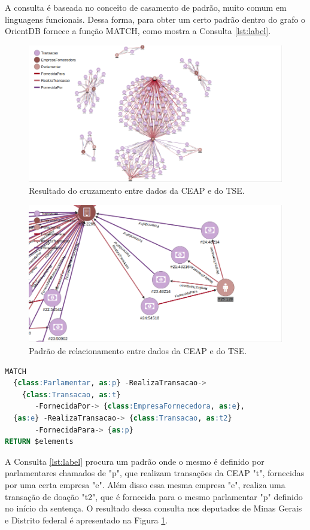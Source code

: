 \documentclass[12pt]{article}
\begin{document}
	A consulta é baseada no conceito de casamento de padrão, muito comum em linguagens funcionais. Dessa forma, para obter um certo padrão dentro do grafo o OrientDB fornece a função MATCH, como mostra a Consulta \ref{lst:label}.
	
\begin{figure}[ht]
\centering
\includegraphics[width=.85\textwidth]{orient.png}
\caption{Resultado do cruzamento entre dados da CEAP e do TSE.}
\label{fig:orient}
\end{figure}

\begin{figure}[ht]
\centering
\includegraphics[width=.85\textwidth]{padrao.png}
\caption{Padrão de relacionamento entre dados da CEAP e do TSE.}
\label{fig:padrao}
\end{figure}

\begin{lstlisting}[label={lst:label}, caption={Consulta de relacionamento de doações entre deputados e empresas.},captionpos=b, language=sql]
MATCH 
  {class:Parlamentar, as:p} -RealizaTransacao-> 
  	{class:Transacao, as:t} 
       -FornecidaPor-> {class:EmpresaFornecedora, as:e},
  {as:e} -RealizaTransacao-> {class:Transacao, as:t2} 
  	   -FornecidaPara-> {as:p}
RETURN $elements
\end{lstlisting}

A Consulta \ref{lst:label} procura um padrão onde o mesmo é definido por parlamentares chamados de "p", que realizam transações da CEAP "t", fornecidas por uma certa empresa "e". Além disso essa mesma empresa "e", realiza uma transação de doação "t2", que é fornecida para o mesmo parlamentar "p" definido no início da sentença. O resultado dessa consulta nos deputados de Minas Gerais e Distrito federal é apresentado na Figura \ref{fig:orient}.
\end{document}
